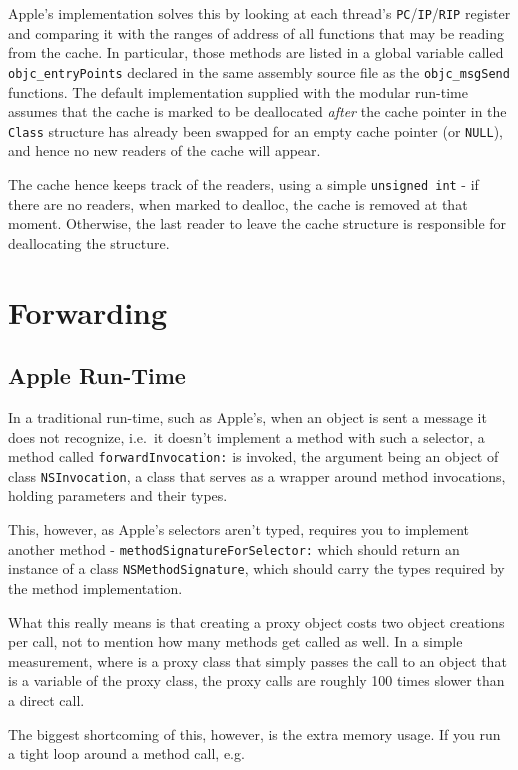 Apple's implementation solves this by looking at each thread's \verb=PC=/\verb=IP=/\verb=RIP= register and comparing it with the ranges of address of all functions that may be reading from the cache. In particular, those methods are listed in a global variable called \verb=objc_entryPoints= declared in the same assembly source file as the \verb=objc_msgSend= functions. The default implementation supplied with the modular run-time assumes that the cache is marked to be deallocated \emph{after} the cache pointer in the \verb=Class= structure has already been swapped for an empty cache pointer (or \verb=NULL=), and hence no new readers of the cache will appear.

The cache hence keeps track of the readers, using a simple \verb=unsigned int= - if there are no readers, when marked to dealloc, the cache is removed at that moment. Otherwise, the last reader to leave the cache structure is responsible for deallocating the structure.

\section{Forwarding}

\subsection{Apple Run-Time}
In a traditional run-time, such as Apple's, when an object is sent a message it does not recognize, i.e.\ it doesn't implement a method with such a selector, a method called \verb=forwardInvocation:= is invoked, the argument being an object of class \verb=NSInvocation=, a class that serves as a wrapper around method invocations, holding parameters and their types.

This, however, as Apple's selectors aren't typed, requires you to implement another method - \verb=methodSignatureForSelector:= which should return an instance of a class \verb=NSMethodSignature=, which should carry the types required by the method implementation.

What this really means is that creating a proxy object costs two object creations per call, not to mention how many methods get called as well. In a simple measurement, where is a proxy class that simply passes the call to an object that is a variable of the proxy class, the proxy calls are roughly 100 times slower than a direct call.

The biggest shortcoming of this, however, is the extra memory usage. If you run a tight loop around a method call, e.g.


